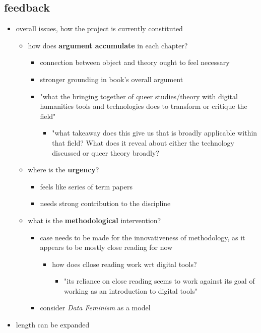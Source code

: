 \documentclass[11pt]{article}
\begin{document}
\subsection{feedback}
\label{sec:org2796df5}
\begin{itemize}
\item overall issues, how the project is currently constituted
\begin{itemize}
\item how does \textbf{argument accumulate} in each chapter?
\begin{itemize}
\item connection between object and theory ought to feel necessary
\item stronger grounding in book's overall argument
\item "what the bringing together of queer studies/theory with digital
humanities tools and technologies does to transform or critique
the field"
\begin{itemize}
\item "what takeaway does this give us that is broadly applicable
within that field? What does it reveal about either the
technology discussed or queer theory broadly?
\end{itemize}
\end{itemize}
\item where is the \textbf{urgency}?
\begin{itemize}
\item feels like series of term papers
\item needs strong contribution to the discipline
\end{itemize}
\item what is the \textbf{methodological} intervention?
\begin{itemize}
\item case needs to be made for the innovativeness of methodology, as
it appears to be mostly close reading for now
\begin{itemize}
\item how does cllose reading work wrt digital tools?
\begin{itemize}
\item "its reliance on close reading seems to work against its
goal of working as an introduction to digital tools"
\end{itemize}
\end{itemize}
\item consider \emph{Data Feminism} as a model
\end{itemize}
\end{itemize}
\item length can be expanded
\end{itemize}
\end{document}
